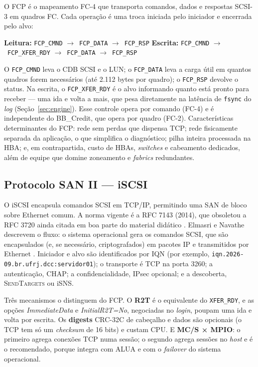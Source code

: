 \documentclass[11pt,a4paper]{article}
\newcommand{\seta}{$\rightarrow$}
\begin{document}
O FCP é o mapeamento FC-4 que transporta comandos, dados e respostas SCSI-3 em quadros FC. Cada operação
é uma troca iniciada pelo iniciador e encerrada pelo alvo:

\begin{center}\footnotesize
\textbf{Leitura:} \texttt{FCP\_CMND} \seta\ \texttt{FCP\_DATA} \seta\ \texttt{FCP\_RSP}
\qquad
\textbf{Escrita:} \texttt{FCP\_CMND} \seta\ \texttt{FCP\_XFER\_RDY} \seta\ \texttt{FCP\_DATA} \seta\ \texttt{FCP\_RSP}
\end{center}

O \texttt{FCP\_CMND} leva o CDB SCSI e o LUN; o \texttt{FCP\_DATA} leva a carga útil em quantos quadros
forem necessários (até 2.112 bytes por quadro); o \texttt{FCP\_RSP} devolve o status. Na escrita, o
\texttt{FCP\_XFER\_RDY} é o alvo informando quanto está pronto para receber --- uma ida e volta a mais,
que pesa diretamente na latência de \texttt{fsync} do \textit{log} (Seção~\ref{sec:engine}). Esse
controle opera por comando (FC-4) e é independente do BB\_Credit, que opera por quadro (FC-2).
Características determinantes do FCP: rede sem perdas que dispensa TCP; rede fisicamente separada da
aplicação, o que simplifica o diagnóstico; pilha inteira processada na HBA; e, em contrapartida, custo
de HBAs, \textit{switches} e cabeamento dedicados, além de equipe que domine zoneamento e
\textit{fabrics} redundantes.

\subsection{Protocolo SAN II --- iSCSI}
\label{sec:iscsi}

O iSCSI encapsula comandos SCSI em TCP/IP, permitindo uma SAN de bloco sobre Ethernet comum. A norma
vigente é a RFC 7143 (2014), que obsoletou a RFC 3720 ainda citada em boa parte do material didático
\cite{rfc7143}. Elmasri e Navathe descrevem o fluxo: o sistema operacional gera os comandos SCSI, que
são encapsulados (e, se necessário, criptografados) em pacotes IP e transmitidos por Ethernet
\cite{elmasri2018}. Iniciador e alvo são identificados por IQN (por exemplo,
\texttt{iqn.2026-09.br.ufrj.dcc:servidor01}); o transporte é TCP na porta 3260; a autenticação, CHAP; a
confidencialidade, IPsec opcional; e a descoberta, \textsc{SendTargets} ou iSNS.

Três mecanismos o distinguem do FCP. O \textbf{R2T} é o equivalente do \texttt{XFER\_RDY}, e as opções
\textit{ImmediateData} e \textit{InitialR2T=No}, negociadas no \textit{login}, poupam uma ida e volta por
escrita. Os \textbf{digests} CRC-32C de cabeçalho e dados são opcionais (o TCP tem só um
\textit{checksum} de 16 bits) e custam CPU. E \textbf{MC/S × MPIO}: o primeiro agrega conexões TCP numa
sessão; o segundo agrega sessões no \textit{host} e é o recomendado, porque integra com ALUA e com o
\textit{failover} do sistema operacional.
\end{document}
